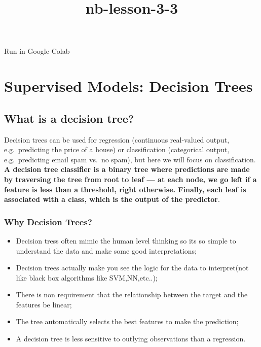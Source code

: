 \documentclass{article}
\title{nb-lesson-3-3}
\begin{document}
    
    \maketitle
    
    

    
    Run in Google Colab

    \section{Supervised Models: Decision
Trees}\label{supervised-models-decision-trees}

    \subsection{What is a decision tree?}\label{what-is-a-decision-tree}

Decision trees can be used for regression (continuous real-valued
output, e.g.~predicting the price of a house) or classification
(categorical output, e.g.~predicting email spam vs.~no spam), but here
we will focus on classification. \textbf{A decision tree classifier is a
binary tree where predictions are made by traversing the tree from root
to leaf --- at each node, we go left if a feature is less than a
threshold, right otherwise. Finally, each leaf is associated with a
class, which is the output of the predictor}.

\subsubsection{Why Decision Trees?}\label{why-decision-trees}

\begin{itemize}
\item
  Decision tress often mimic the human level thinking so its so simple
  to understand the data and make some good interpretations;
\item
  Decision trees actually make you see the logic for the data to
  interpret(not like black box algorithms like SVM,NN,etc..);
\item
  There is non requirement that the relationship between the target and
  the features be linear;
\item
  The tree automatically selects the best features to make the
  prediction;
\item
  A decision tree is less sensitive to outlying observations than a
  regression.
\end{itemize}
\end{document}
